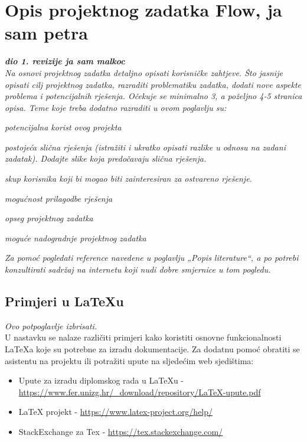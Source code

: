 \chapter{Opis projektnog zadatka Flow, ja sam petra}
		
		\textbf{\textit{dio 1. revizije ja sam malkoc}}\\
		
		\textit{Na osnovi projektnog zadatka detaljno opisati korisničke zahtjeve. Što jasnije opisati cilj projektnog zadatka, razraditi problematiku zadatka, dodati nove aspekte problema i potencijalnih rješenja. Očekuje se minimalno 3, a poželjno 4-5 stranica opisa.	Teme koje treba dodatno razraditi u ovom poglavlju su:}
		\begin{packed_item}
			\item \textit{potencijalna korist ovog projekta}
			\item \textit{postojeća slična rješenja (istražiti i ukratko opisati razlike u odnosu na zadani zadatak). Dodajte slike koja predočavaju slična rješenja.}
			\item \textit{skup korisnika koji bi mogao biti zainteresiran za ostvareno rješenje.}
			\item \textit{mogućnost prilagodbe rješenja }
			\item \textit{opseg projektnog zadatka}
			\item \textit{moguće nadogradnje projektnog zadatka}
		\end{packed_item}
		
		\textit{Za pomoć pogledati reference navedene u poglavlju „Popis literature“, a po potrebi konzultirati sadržaj na internetu koji nudi dobre smjernice u tom pogledu.}
		\eject
		
		\section{Primjeri u LaTeXu}
		
		\textit{Ovo potpoglavlje izbrisati.}\\

		U nastavku se nalaze različiti primjeri kako koristiti osnovne funkcionalnosti LaTeXa koje su potrebne za izradu dokumentacije. Za dodatnu pomoć obratiti se asistentu na projektu ili potražiti upute na sljedećim web sjedištima:
		\begin{itemize}
			\item Upute za izradu diplomskog rada u LaTeXu - \url{https://www.fer.unizg.hr/_download/repository/LaTeX-upute.pdf}
			\item LaTeX projekt - \url{https://www.latex-project.org/help/}
			\item StackExchange za Tex - \url{https://tex.stackexchange.com/}\\
		
		\end{itemize} 	


